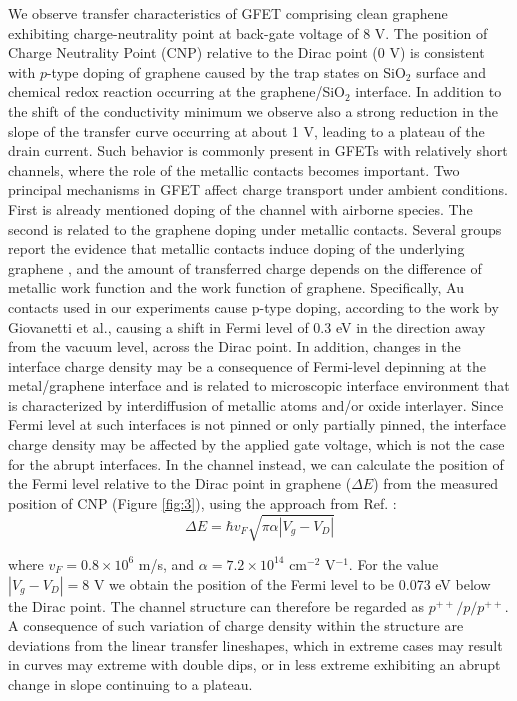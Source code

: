 \documentclass[preprint,aip,jap]{revtex4-2}
\begin{document}
We observe transfer characteristics of GFET comprising clean graphene exhibiting charge-neutrality point at back-gate voltage of 8 V.  The position of Charge Neutrality Point (CNP) relative to the Dirac point (0 V) is consistent with $p$-type doping of graphene caused by the trap states on SiO$_{2}$ surface and chemical redox reaction occurring at the graphene/SiO$_{2}$ interface\cite{feng-2014,peng-2017,lafkioti-2010}.  In addition to the shift of the conductivity minimum we observe also a strong reduction in the slope of the transfer curve occurring at about 1 V, leading to a plateau of the drain current.  Such behavior is commonly present in GFETs with relatively short channels, where the role of the metallic contacts becomes important\cite{bartolomeo-2015,nouchi-2008,nouchi-2014}. Two principal mechanisms in GFET affect charge transport under ambient conditions. First is already mentioned doping of the channel with airborne species. The second is related to the graphene doping under metallic contacts\cite{farmer-2009,giovannetti-2008,lee-2008,mueller-2009}.  Several groups report the evidence that metallic contacts induce doping of the underlying graphene \cite{giovannetti-2008,mueller-2009,huard-2008}, and the amount of transferred charge depends on the difference of metallic work function and the work function of graphene.  Specifically, Au contacts used in our experiments cause p-type doping, according to the work by Giovanetti et al.\cite{giovannetti-2008}, causing a shift in Fermi level of 0.3 eV in the direction away from the vacuum level, across the Dirac point. In addition, changes in the interface charge density may be a consequence of Fermi-level depinning at the metal/graphene interface and is related to microscopic interface environment that is characterized by interdiffusion of metallic atoms and/or oxide interlayer\cite{nouchi-2008,nouchi-2014}. Since Fermi level at such interfaces is not pinned or only partially pinned\cite{dibartolomeo-2011}, the interface charge density may be affected by the applied gate voltage, which is not the case for the abrupt interfaces.  In the channel instead, we can calculate the position of the Fermi level relative to the Dirac point in graphene ($\Delta E$) from the measured position of CNP (Figure \ref{fig:3}), using the approach from Ref. :
\begin{equation}
  \label{eq:1}
  \Delta E = \hbar v_{F}\sqrt{\pi\alpha|V_{g}-V_{D}|}
\end{equation}

where $v_F=0.8\times10^6$ m/s, and $\alpha=7.2\times10^{14}$ cm$^{-2}$ V$^{-1}$. For the value $|V_g-V_D |=8$ V we obtain the position of the Fermi level to be 0.073 eV below the Dirac point. The channel structure can therefore be regarded as $p^{++}/p/p^{++}$. A consequence of such variation of charge density within the structure are deviations from the linear transfer lineshapes, which in extreme cases may result in curves may extreme with double dips\cite{nouchi-2014,nam-2012}, or in less extreme exhibiting an abrupt change in slope continuing to a plateau. 
\end{document}
